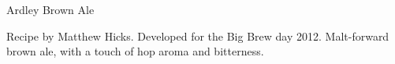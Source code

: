 \begin{recipe}{Ardley Brown Ale} %

\begin{aboutblock}
Recipe by Matthew Hicks. Developed for the Big Brew day 2012. Malt-forward brown
ale, with a touch of hop aroma and bitterness. \sourceaha
\end{aboutblock}


\begin{methodandtiming}

\begin{mashsteps}
\end{mashsteps}

\begin{fermentationsteps}
\end{fermentationsteps}

\end{methodandtiming}

\recipebreak

\begin{ingredientsblock}

\begin{malts}
\end{malts}

\begin{hops}
\end{hops}


\end{ingredientsblock}

\end{recipe}

